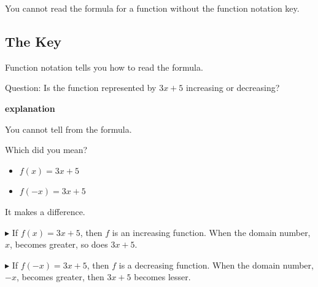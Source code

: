 \documentclass{ximera}
\begin{document}
You cannot read the formula for a function without the function notation key.


\subsection*{The Key}


Function notation tells you how to read the formula. 



\begin{example}



Question:  Is the function represented by $3x+5$ increasing or decreasing?


\textbf{\textcolor{red!75!green}{explanation}} 


You cannot tell from the formula.


Which did you mean?


\begin{itemize}
\item $f(x) = 3x + 5$
\item $f(-x) = 3x + 5$
\end{itemize}

It makes a difference. 



\textbf{\textcolor{blue!55!black}{$\blacktriangleright$}} If $f(x) = 3x + 5$, then $f$ is an increasing function.  When the domain number, $x$, becomes greater, so does $3x+5$. 



\textbf{\textcolor{blue!55!black}{$\blacktriangleright$}} If $f(-x) = 3x + 5$, then $f$ is a decreasing function.  When the domain number, $-x$, becomes greater, then $3x+5$ becomes lesser. 




\end{example}
\end{document}
